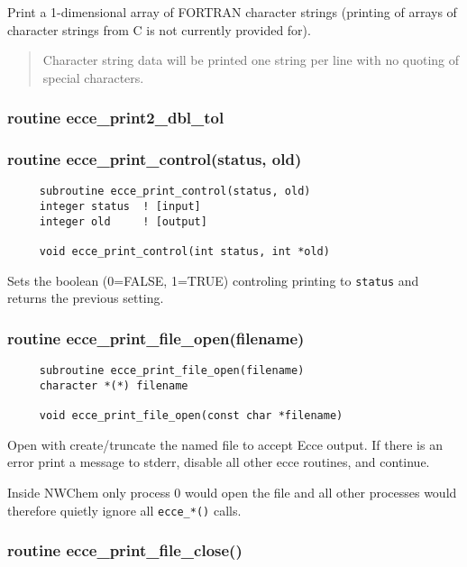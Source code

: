 Print a 1-dimensional array of FORTRAN character strings (printing of
arrays of character strings from C is not currently provided for).

\begin{quotation}

      Character string data will be printed one string per line
      with no quoting of special characters.

\end{quotation}

\subsubsection{ routine ecce\_print2\_dbl\_tol }

\subsubsection{routine ecce\_print\_control(status, old)}

\begin{verbatim}
     subroutine ecce_print_control(status, old)
     integer status  ! [input]
     integer old     ! [output]

     void ecce_print_control(int status, int *old)
\end{verbatim}

Sets the boolean (0=FALSE, 1=TRUE) controling printing to \verb=status= and
returns the previous setting.

\subsubsection{  routine ecce\_print\_file\_open(filename)}

\begin{verbatim}
     subroutine ecce_print_file_open(filename)
     character *(*) filename

     void ecce_print_file_open(const char *filename)
\end{verbatim}
    Open with create/truncate the named file to accept Ecce output.
    If there is an error print a message to stderr, disable all
    other ecce routines, and continue. 

    Inside NWChem only process $0$ would open the file and all other
    processes would therefore quietly ignore all \verb+ecce_*()+ calls.

\subsubsection{ routine ecce\_print\_file\_close()}

